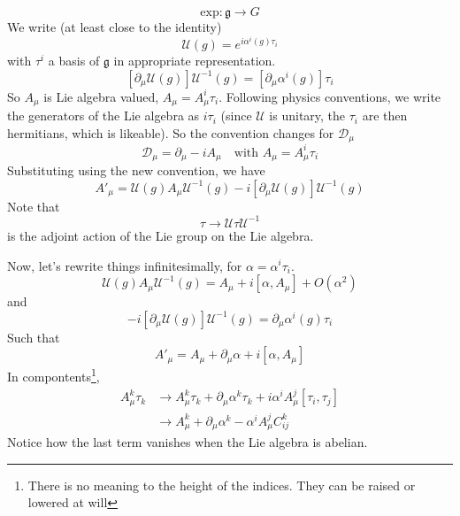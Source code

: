 \documentclass[a4paper]{book}
\theoremstyle{definition}
\theoremstyle{remark}
\begin{document}
\begin{equation}
    \text{exp} : \mathfrak g \rightarrow G
\end{equation}
We write (at least close to the identity) 
\begin{equation}
    \mathcal U(g) = e^{i\alpha^i(g)\tau_i}
\end{equation}
with $\tau^i$ a basis of $\mathfrak{g}$ in appropriate representation. 
\begin{equation}
    \left[\partial_\mu \mathcal U (g)\right] \mathcal U ^{-1}(g) = \left[\partial_\mu \alpha^i (g)\right]\tau_i
\end{equation}
So $A_\mu$ is Lie algebra valued, $A_\mu = A_\mu^i \tau_i$. Following physics conventions, we write the generators of the Lie algebra as $i \tau_i$ (since $\mathcal U$ is unitary, the $\tau_i$ are then hermitians, which is likeable). So the convention changes for $\mathcal D_\mu$
\begin{equation}
    \mathcal D_\mu = \partial_\mu - iA_\mu \quad \text{with  } A_\mu = A_\mu^i \tau_i
\end{equation}
Substituting using the new convention, we have 
\begin{equation}
    A'_\mu = \mathcal U (g)A_\mu\mathcal U ^{-1}(g) - i\left[\partial_\mu \mathcal U (g)\right] \mathcal U ^{-1}(g)
\end{equation}
Note that 
\begin{equation}
    \tau \rightarrow \mathcal U \tau \mathcal U ^{-1}
\end{equation}
is the adjoint action of the Lie group on the Lie algebra. \par \medskip 

Now, let's rewrite things infinitesimally, for $\alpha = \alpha^i\tau_i$. 
\begin{equation}
    \mathcal U (g) A_\mu \mathcal U^{-1}(g) = A_\mu + i[\alpha, A_\mu] + O(\alpha^2)
\end{equation}
and 
\begin{equation}
    - i\left[\partial_\mu \mathcal U (g)\right] \mathcal U ^{-1}(g) = \partial_\mu \alpha^i(g)\tau_i
\end{equation}
Such that 
\begin{equation}
    A'_\mu = A_\mu + \partial_\mu \alpha + i[\alpha, A_\mu ]
\end{equation}
In compontents\footnote{There is no meaning to the height of the indices. They can be raised or lowered at will},
\begin{equation}
    \begin{aligned}
        A^k_\mu \tau_k &\rightarrow A^k_\mu \tau_k + \partial_\mu \alpha^k \tau_k + i\alpha^i A^j_\mu [\tau_i, \tau_j] \\
        &\rightarrow A^k_\mu + \partial_\mu \alpha^k - \alpha^i A^j_\mu C^k_{ij}
    \end{aligned}
\end{equation} 
Notice how the last term vanishes when the Lie algebra is abelian. \par \medskip 
\end{document}

